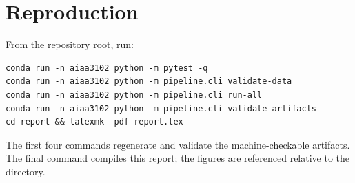 \documentclass[10pt]{article}
\newcommand{\code}[1]{\texttt{\detokenize{#1}}}
\begin{document}
\section{Reproduction}

From the repository root, run:

\begin{verbatim}
conda run -n aiaa3102 python -m pytest -q
conda run -n aiaa3102 python -m pipeline.cli validate-data
conda run -n aiaa3102 python -m pipeline.cli run-all
conda run -n aiaa3102 python -m pipeline.cli validate-artifacts
cd report && latexmk -pdf report.tex
\end{verbatim}

The first four commands regenerate and validate the machine-checkable artifacts. The final command compiles this report; the figures are referenced relative to the \code{report/} directory.
\end{document}
